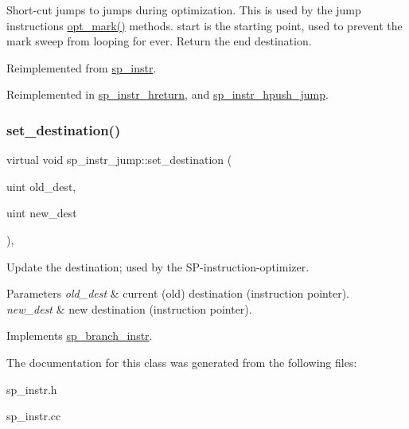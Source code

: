 Short-\/cut jumps to jumps during optimization. This is used by the jump instructions\textquotesingle{} \mbox{\hyperlink{classsp__instr__jump_a4daedb439c97a78adf9957fc35121dbe}{opt\+\_\+mark()}} methods. \textquotesingle{}start\textquotesingle{} is the starting point, used to prevent the mark sweep from looping for ever. Return the end destination. 

Reimplemented from \mbox{\hyperlink{classsp__instr_aa06a5e2fcf128a0ed13e802b11efaba0}{sp\+\_\+instr}}.



Reimplemented in \mbox{\hyperlink{classsp__instr__hreturn_aad1c6b1378f1f2f26fb3be33622f0ce2}{sp\+\_\+instr\+\_\+hreturn}}, and \mbox{\hyperlink{classsp__instr__hpush__jump_a7b00002d8497221812af5f222a2a1732}{sp\+\_\+instr\+\_\+hpush\+\_\+jump}}.

\mbox{\label{classsp__instr__jump_aee2d8071b4f12109135a0e22a9ba3c71}} 
\subsubsection{\texorpdfstring{set\+\_\+destination()}{set\_destination()}}
{\footnotesize\ttfamily virtual void sp\+\_\+instr\+\_\+jump\+::set\+\_\+destination (\begin{DoxyParamCaption}\item[{uint}]{old\+\_\+dest,  }\item[{uint}]{new\+\_\+dest }\end{DoxyParamCaption})\hspace{0.3cm}{\ttfamily [inline]}, {\ttfamily [virtual]}}

Update the destination; used by the SP-\/instruction-\/optimizer.


\begin{DoxyParams}{Parameters}
{\em old\+\_\+dest} & current (old) destination (instruction pointer). \\
\hline
{\em new\+\_\+dest} & new destination (instruction pointer). \\
\hline
\end{DoxyParams}


Implements \mbox{\hyperlink{classsp__branch__instr_ad5bc8e2fede785323c1749b6269869c3}{sp\+\_\+branch\+\_\+instr}}.



The documentation for this class was generated from the following files\+:\begin{DoxyCompactItemize}
\item 
sp\+\_\+instr.\+h\item 
sp\+\_\+instr.\+cc\end{DoxyCompactItemize}
